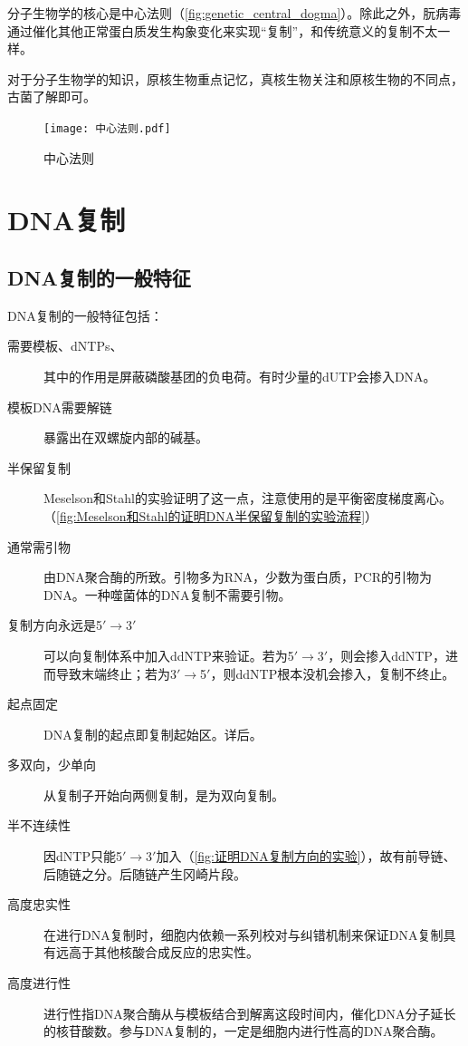 
分子生物学的核心是中心法则（\autoref{fig:genetic_central_dogma}）。除此之外，朊病毒通过催化其他正常蛋白质发生构象变化来实现“复制”，和传统意义的复制不太一样。

对于分子生物学的知识，原核生物重点记忆，真核生物关注和原核生物的不同点，古菌了解即可。

\begin{figure}[htbp]
	\centering
	\texttt{[image: 中心法则.pdf]}
	\caption{中心法则}
	\label{fig:genetic_central_dogma}
\end{figure}


\section{DNA复制}

\subsection{DNA复制的一般特征}

DNA复制的一般特征包括：

\begin{description}
	\item[需要模板、dNTPs、] 其中的作用是屏蔽磷酸基团的负电荷。有时少量的dUTP会掺入DNA。
	\item[模板DNA需要解链] 暴露出在双螺旋内部的碱基。
	\item[半保留复制] Meselson和Stahl的实验证明了这一点，注意使用的是平衡密度梯度离心。（\autoref{fig:Meselson和Stahl的证明DNA半保留复制的实验流程}）
	\item[通常需引物] 由DNA聚合酶的所致。引物多为RNA，少数为蛋白质，PCR的引物为DNA。一种噬菌体的DNA复制不需要引物。
	\item[复制方向永远是5$\prime$$\longrightarrow$3$\prime$] 可以向复制体系中加入ddNTP来验证。若为5$\prime$$\longrightarrow$3$\prime$，则会掺入ddNTP，进而导致末端终止；若为3$\prime$$\longrightarrow$5$\prime$，则ddNTP根本没机会掺入，复制不终止。
	\item[起点固定] DNA复制的起点即复制起始区。详后。
	\item[多双向，少单向] 从复制子开始向两侧复制，是为双向复制。
	\item[半不连续性] 因dNTP只能5$\prime$$\longrightarrow$3$\prime$加入（\autoref{fig:证明DNA复制方向的实验}），故有前导链、后随链之分。后随链产生冈崎片段。
	\item[高度忠实性] 在进行DNA复制时，细胞内依赖一系列校对与纠错机制来保证DNA复制具有远高于其他核酸合成反应的忠实性。
	\item[高度进行性] 进行性指DNA聚合酶从与模板结合到解离这段时间内，催化DNA分子延长的核苷酸数。参与DNA复制的，一定是细胞内进行性高的DNA聚合酶。
\end{description}

